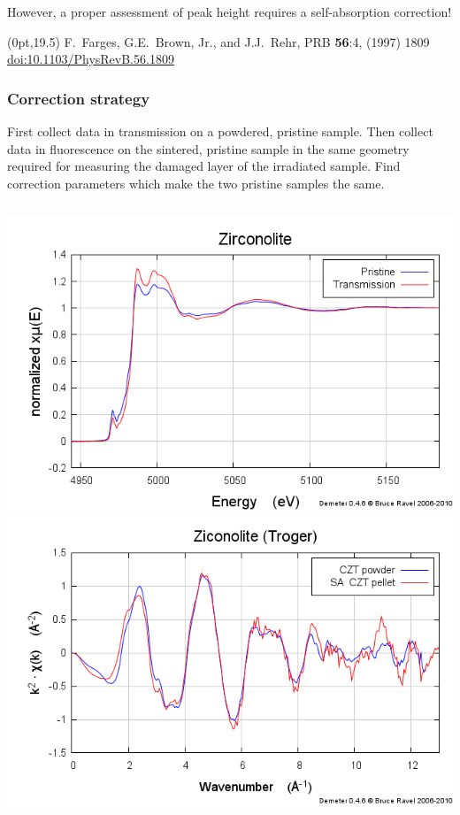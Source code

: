 \documentclass[10pt, xcolor=x11names, compress, handout]{beamer}
\begin{document}
\begin{frame}
  \smallskip

  However, a proper assessment of peak height requires a
  self-absorption correction!

  \begin{textblock*}{0.5\linewidth}(0pt,19.5\TPVertModule)
    \tiny%
    F.~Farges, G.E.~Brown, Jr., and J.J.~Rehr, PRB \textbf{56}:4,
    (1997) 1809
    \href{http://dx.doi.org/10.1103/PhysRevB.56.1809}
    {\color{Blue2}doi:10.1103/PhysRevB.56.1809}
  \end{textblock*}
\end{frame}

\begin{frame}
  \frametitle{Correction strategy}
  \small
  First collect data in transmission on a powdered, pristine sample.
  Then collect data in fluorescence on the sintered, pristine sample
  in the same geometry required for measuring the damaged layer of the
  irradiated sample.  Find correction parameters which make the two
  pristine samples the same.
  \begin{columns}
    \begin{column}{0.5\linewidth}
      \begin{center}
        \includegraphics[width=0.8\linewidth]{images/pristine.png}\\
        \includegraphics[width=0.8\linewidth]{images/zirconolite_chik.png}

\end{center}
\end{column}
\end{columns}
\end{frame}
\end{document}
